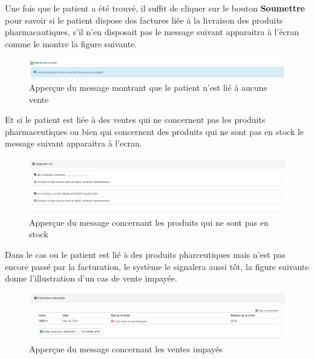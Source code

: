 \documentclass[12pt,a4paper]{report}
\begin{document}
Une fois que le patient a été trouvé, il suffit de cliquer sur le bouton \textbf{Soumettre} pour savoir si le patient dispose des factures liée à la livraison des produits pharmacautiques, s'il n'en disposait pas le message suivant apparaitra à l'écran comme le montre la figure suivante.

\begin{figure}[h]
\begin{center}
\includegraphics[width=14cm]{pic/NoSaleFound.png}
\end{center}
\caption{Apperçue du message montrant que le patient n'est lié à aucune vente}
\label{Apperçue du message montrant que le patient n'est lié à aucune vente}
\end{figure}

Et si le patient est liée à des ventes qui ne concernent pas les produits pharmaceutiques ou bien qui concernent des produits qui ne sont pas en stock le message suivant apparaitra à l'ecran.

\begin{figure}[h]
\begin{center}
\includegraphics[width=14cm]{pic/NotInStock.png}
\end{center}
\caption{Apperçue du message concernant les produits qui ne sont pas en stock}
\label{Apperçue du message concernant les produits qui ne sont pas en stock}
\end{figure}

Dans le cas ou le patient est lié à des produits pharceutiques mais n'est pas encore passé par la facturation, le système le signalera aussi tôt, la figure suivante donne l'illustration d'un cas de vente impayée.

\begin{figure}[h]
\begin{center}
\includegraphics[width=14cm]{pic/NotPaid.png}
\end{center}
\caption{Apperçue du message concernant les ventes impayés}
\label{Apperçue du message concernant les ventes impayés}
\end{figure}
\end{document}

